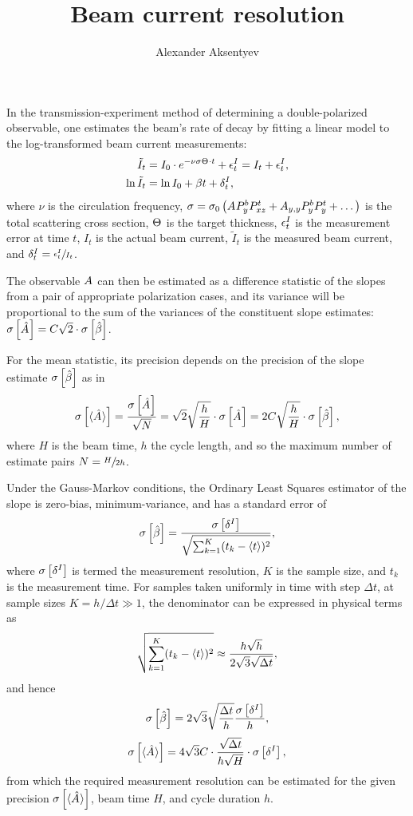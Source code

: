 \documentclass{article}
\newcommand{\Tint}{\Delta t}
\begin{document}
	
\title{Beam current resolution}
\author{Alexander Aksentyev}
\maketitle
	
In the transmission-experiment method of determining a double-polarized observable, one estimates the beam's rate of decay by fitting a linear model to the log-transformed beam current measurements:
\begin{align*}
	\tilde{I}_t  &= I_0 \cdot e^{-\nu\CS\Thick\cdot t} + \err^I_t = I_t + \err^I_t, \\
	\ln \tilde{I}_t &= \ln I_0 + \slp t + \delta^I_t,
\end{align*}
	where $\nu$ is the circulation frequency, $\CS = \CS[0]\bkt{\A P^b_y P^t_{xz} + A_{y,y} P^b_y P^t_y + \dots}$ is the total scattering cross section, $\Thick$ is the target thickness, $\epsilon^I_t$ is the measurement error at time $t$, $I_t$ is the actual beam current, $\tilde{I}_t$ is the measured beam current, and $\delta^I_t = \sfrac{\epsilon^I_t}{I_t}$.


The observable $\A$ can then be estimated as a difference statistic of the slopes from a pair of appropriate polarization cases, and its variance will be proportional to the sum of the variances of the constituent slope estimates: $\SE{\A*} = C\sqrt{2}\cdot\SE{\slp*}$.

For the mean statistic, its precision depends on the precision of the slope estimate $\SE{\slp*}$ as in
\begin{equation}\label{eq:AvgASE}
\SE{\avg{\A*}} = \frac{\SE{\A*}}{\sqrt N} = \sqrt{2}\sqrt{\frac hH}\cdot\SE{\A*} = 2C\sqrt{\frac hH}\cdot\SE{\slp*},
\end{equation}
where $H$ is the beam time, $h$ the cycle length, and so the maximum number of estimate pairs $N = \sfrac{H}{2h}$.

Under the Gauss-Markov conditions, the Ordinary Least Squares estimator of the slope is zero-bias, minimum-variance, and has a standard error of
\begin{equation}\label{eq:SlpVarGM}
\SE{\slp*} = \frac{\SE{\delta^I}}{\sqrt{\sum_{k=1}^K (t_k - \avg{t})^2}},
\end{equation}
where $\SE{\delta^I}$ is termed the measurement resolution, $K$ is the sample size, and $t_k$ is the measurement time. For samples taken uniformly in time with step $\Tint$, at sample sizes $K = h/\Tint \gg 1$, the denominator can be expressed in physical terms as
\[
\sqrt{\sum_{k=1}^K (t_k - \avg{t})^2} \approx \frac{h\sqrt{h}}{2\sqrt{3}\sqrt{\Tint}},
\]
and hence 
\begin{equation}\label{eq:SlpVar}
	\SE{\slp*} = 2\sqrt{3}\sqrt{\frac{\Delta t}{h}}\frac{\SE{\delta^I}}{h},
\end{equation}
\begin{equation}
	\SE{\avg{\A*}} = 4\sqrt{3}C\cdot \frac{\sqrt{\Tint}}{h\sqrt{H}}\cdot\SE{\delta^I},
\end{equation}
from which the required measurement resolution can be estimated for the given precision $\SE{\avg{\A*}}$, beam time $H$, and cycle duration $h$.
\end{document}
